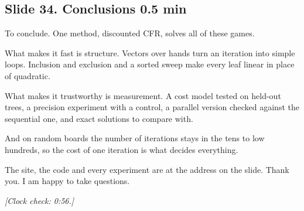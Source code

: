 \documentclass[11pt]{article}
\newcommand{\slidehead}[3]{\subsection*{Slide #1. #2 \hfill {\normalfont\small #3}}}
\newcommand{\cue}[1]{{\small\itshape\color{black!65}[#1]}}
\begin{document}
\slidehead{34}{Conclusions}{0.5 min}
\begin{say}
To conclude. One method, discounted CFR, solves all of these games.

What makes it fast is structure. Vectors over hands turn an iteration into simple loops. Inclusion and exclusion
and a sorted sweep make every leaf linear in place of quadratic.

What makes it trustworthy is measurement. A cost model tested on held-out trees, a precision experiment with a
control, a parallel version checked against the sequential one, and exact solutions to compare with.

And on random boards the number of iterations stays in the tens to low hundreds, so the cost of one iteration is
what decides everything.

The site, the code and every experiment are at the address on the slide. Thank you. I am happy to take questions.
\end{say}
\cue{Clock check: 0:56.}

\end{document}
